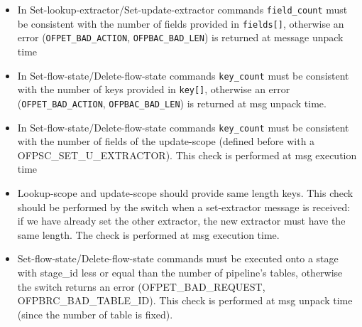 \begin{itemize}
\item In Set-lookup-extractor/Set-update-extractor commands \texttt{field\_count} must be consistent with the number of fields provided in \texttt{fields[]}, otherwise an error (\texttt{OFPET\_BAD\_ACTION}, \texttt{OFPBAC\_BAD\_LEN}) is returned at message unpack time

\item In Set-flow-state/Delete-flow-state commands \texttt{key\_count} must be consistent with the number of keys provided in \texttt{key[]}, otherwise an error (\texttt{OFPET\_BAD\_ACTION}, \texttt{OFPBAC\_BAD\_LEN}) is returned at msg unpack time. 

\item In Set-flow-state/Delete-flow-state commands \texttt{key\_count} must be consistent with the number of fields of the update-scope (defined before with a OFPSC\_SET\_U\_EXTRACTOR). This check is performed at msg execution time

\item Lookup-scope and update-scope should provide same length keys. This check should be performed by the switch when a set-extractor message is received: if we have already set the other extractor, the new extractor must have the same length. The check is performed at msg execution time.

\item Set-flow-state/Delete-flow-state commands must be executed onto a stage with stage\_id less or equal than the number of pipeline’s tables, otherwise the switch returns an error (OFPET\_BAD\_REQUEST, OFPBRC\_BAD\_TABLE\_ID). This check is performed at msg unpack time (since the number of table is fixed).

\end{itemize}